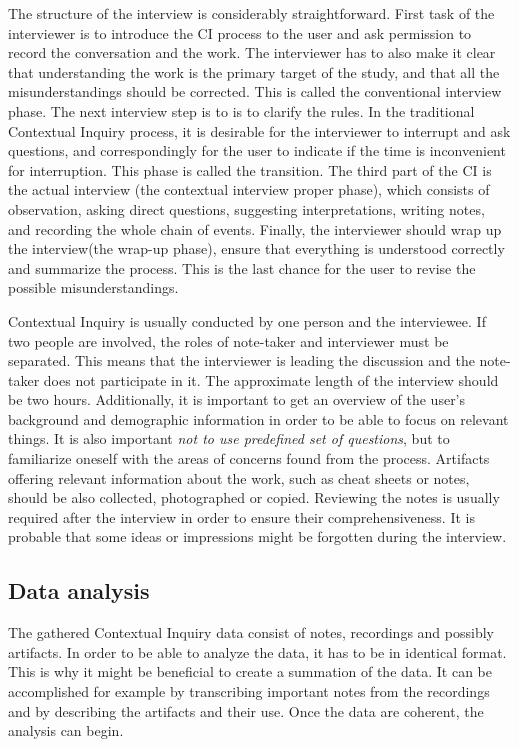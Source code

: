 \documentclass[12pt,a4paper,oneside,pdftex]{report}
\begin{document}
The structure of the interview is considerably straightforward. First task of the interviewer is to introduce the CI process to the user and ask permission to record the conversation and the work. The interviewer has to also make it clear that understanding the work is the primary target of the study, and that all the misunderstandings should be corrected. This is called the conventional interview phase. The next interview step is to is to clarify the rules. In the traditional Contextual Inquiry process, it is desirable for the interviewer to interrupt and ask questions, and correspondingly for the user to indicate if the time is inconvenient for interruption. This phase is called the transition. The third part of the CI is the actual interview (the contextual interview proper phase), which consists of observation, asking direct questions, suggesting interpretations, writing notes, and recording the whole chain of events. Finally, the interviewer should wrap up the interview(the wrap-up phase), ensure that everything is understood correctly and summarize the process. This is the last chance for the user to revise the possible misunderstandings. \citep{RefWorks:21}

Contextual Inquiry is usually conducted by one person and the interviewee. If two people are involved, the roles of note-taker and interviewer must be separated. This means that the interviewer is leading the discussion and the note-taker does not participate in it. The approximate length of the interview should be two hours. Additionally, it is important to get an overview of the user's background and demographic information in order to be able to focus on relevant things. It is also important \emph{not to use predefined set of questions}, but to familiarize oneself with the areas of concerns found from the process. Artifacts offering relevant information about the work, such as cheat sheets or notes, should be also collected, photographed or copied. \citep{RefWorks:27} Reviewing the notes is usually required after the interview in order to ensure their comprehensiveness. It is probable that some ideas or impressions might be forgotten during the interview. \citep{RefWorks:28}


\subsection{Data analysis}

The gathered Contextual Inquiry data consist of notes, recordings and possibly artifacts. In order to be able to analyze the data, it has to be in identical format. This is why it might be beneficial to create a summation of the data. It can be accomplished for example by transcribing important notes from the recordings and by describing the artifacts and their use. Once the data are coherent, the analysis can begin. 
\end{document}
